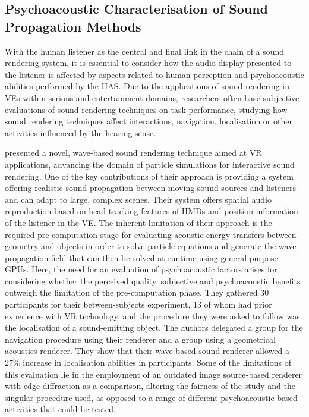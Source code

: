 \subsection{Psychoacoustic Characterisation of Sound Propagation Methods}
With the human listener as the central and final link in the chain of a sound rendering system, it is essential to consider how the audio display presented to the listener is affected by aspects related to human perception and psychoacoustic abilities performed by the HAS. Due to the applications of sound rendering in VEs within serious and entertainment domains, researchers often base subjective evaluations of sound rendering techniques on task performance, studying how sound rendering techniques affect interactions, navigation, localisation or other activities influenced by the hearing sense. \par
\cite{mehra2015wave} presented a novel, wave-based sound rendering technique aimed at VR applications, advancing the domain of particle simulations for interactive sound rendering. One of the key contributions of their approach is providing a system offering realistic sound propagation between moving sound sources and listeners and can adapt to large, complex scenes. Their system offers spatial audio reproduction based on head tracking features of HMDs and position information of the listener in the VE. The inherent limitation of their approach is the required pre-computation stage for evaluating acoustic energy transfers between geometry and objects in order to solve particle equations and generate the wave propagation field that can then be solved at runtime using general-purpose GPUs. Here, the need for an evaluation of psychoacoustic factors arises for considering whether the perceived quality, subjective and psychoacoustic benefits outweigh the limitation of the pre-computation phase. They gathered 30 participants for their between-subjects experiment, 13 of whom had prior experience with VR technology, and the procedure they were asked to follow was the localisation of a sound-emitting object. The authors delegated a group for the navigation procedure using their renderer and a group using a geometrical acoustics renderer. They show that their wave-based sound renderer allowed a $27\%$ increase in localisation abilities in participants. Some of the limitations of this evaluation lie in the employment of an outdated image source-based renderer with edge diffraction as a comparison, altering the fairness of the study and the singular procedure used, as opposed to a range of different psychoacoustic-based activities that could be tested.\par

